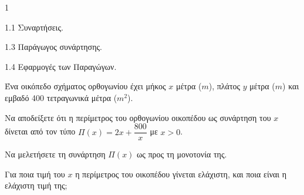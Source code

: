 \begin{ylh}{1}
	\item 1.1 Συναρτήσεις.
	\item 1.3 Παράγωγος συνάρτησης.
	\item 1.4 Εφαρμογές των Παραγώγων.
\end{ylh}
Ένα οικόπεδο σχήματος ορθογωνίου έχει μήκος $x$ μέτρα ($m$), πλάτος $y$ μέτρα ($m$) και εμβαδό 400 τετραγωνικά μέτρα ($m^2$).
\begin{alist}
	\item Να αποδείξετε ότι η περίμετρος του ορθογωνίου οικοπέδου ως συνάρτηση του $x$ δίνεται από τον τύπο $\Pi(x) = 2x + \dfrac{800}{x}$ με $x > 0$. 
	\item Να μελετήσετε τη συνάρτηση $\Pi(x)$ ως προς τη μονοτονία της. 
	\item Για ποια τιμή του $x$ η περίμετρος του οικοπέδου γίνεται ελάχιστη, και ποια είναι η ελάχιστη τιμή της; 
\end{alist}

